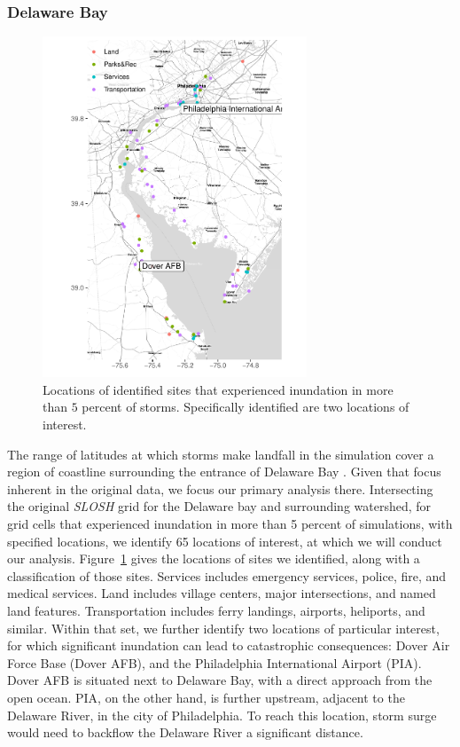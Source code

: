 \subsubsection{Delaware Bay}

\begin{figure}[ht]
    \caption{Locations of identified sites that experienced inundation in more than 
        $5$ percent of storms.  Specifically identified are two locations of 
        interest.  \label{map:delawarebay}}
    \centering
    \includegraphics[height=4in]{./plots/delaware}
\end{figure}

The range of latitudes at which storms make landfall in the simulation cover a region of
    coastline surrounding the entrance of Delaware Bay .  Given that focus inherent in the original data, we focus our primary analysis there.
    Intersecting the original \emph{SLOSH} grid for the Delaware bay and surrounding watershed, 
    for grid cells that experienced inundation in more than 5 percent of simulations, 
    with specified locations, we identify 65 locations of interest, at which we will conduct 
    our analysis.  Figure~\ref{map:delawarebay} gives the locations of sites we identified, along
    with a classification of those sites.  Services includes emergency services, police, fire,
    and medical services.  Land includes village centers, major intersections, and named
    land features.  Transportation includes ferry landings, airports, heliports, and similar.
    Within that set, we further identify two locations of particular interest, 
    for which significant inundation can lead to catastrophic consequences:  
    Dover Air Force Base (Dover AFB), and the Philadelphia International 
    Airport (PIA). Dover AFB is situated next to Delaware Bay, with a direct approach from the
    open ocean.  PIA, on the other hand, is further upstream, adjacent to the Delaware River, 
    in the city of Philadelphia.  To reach this location, storm surge would need to backflow 
    the Delaware River a significant distance.

